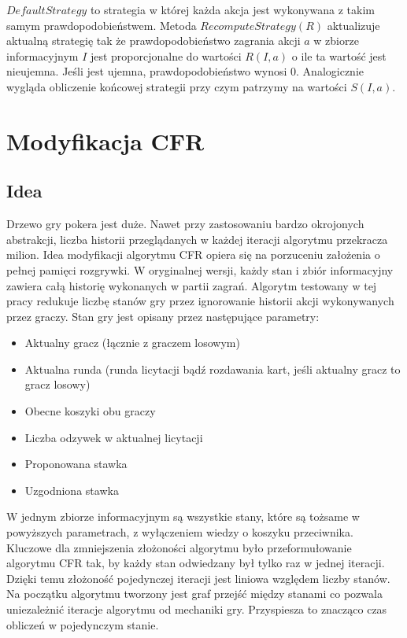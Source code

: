 \documentclass[licencjacka]{pracamgr}
\begin{document}
$\,$ \\
\noindent
$DefaultStrategy$ to strategia w której każda akcja jest wykonywana z takim samym prawdopodobieństwem. Metoda
$RecomputeStrategy(R)$ aktualizuje aktualną strategię tak że prawdopodobieństwo zagrania akcji $a$ w zbiorze informacyjnym
$I$ jest proporcjonalne do wartości $R(I, a)$ o ile ta wartość jest nieujemna. Jeśli jest ujemna, prawdopodobieństwo
wynosi $0$. Analogicznie wygląda obliczenie końcowej strategii przy czym patrzymy na wartości $S(I, a)$.

\chapter{Modyfikacja CFR}

\section{Idea}

Drzewo gry pokera jest duże. Nawet przy zastosowaniu bardzo okrojonych abstrakcji, liczba historii przeglądanych w każdej
iteracji algorytmu przekracza milion. Idea modyfikacji algorytmu CFR opiera się na porzuceniu założenia o pełnej pamięci rozgrywki.
W oryginalnej wersji, każdy stan i zbiór informacyjny zawiera całą historię wykonanych w partii zagrań. Algorytm testowany
w tej pracy redukuje liczbę stanów gry przez ignorowanie historii akcji wykonywanych
przez graczy. Stan gry jest opisany przez następujące parametry: \\

\begin{itemize}
\item Aktualny gracz (łącznie z graczem losowym)
\item Aktualna runda (runda licytacji bądź rozdawania kart, jeśli aktualny gracz to gracz losowy)
\item Obecne koszyki obu graczy
\item Liczba odzywek w aktualnej licytacji
\item Proponowana stawka
\item Uzgodniona stawka
\end{itemize}

\noindent
W jednym zbiorze informacyjnym są wszystkie stany, które są tożsame w powyższych parametrach, z wyłączeniem
wiedzy o koszyku przeciwnika. \\

\noindent
Kluczowe dla zmniejszenia złożoności algorytmu było przeformułowanie algorytmu CFR tak, by każdy
stan odwiedzany był tylko raz w jednej iteracji. Dzięki temu złożoność pojedynczej iteracji jest
liniowa względem liczby stanów. Na początku algorytmu tworzony jest graf przejść między
stanami co pozwala uniezależnić iteracje algorytmu od mechaniki gry. Przyspiesza to znacząco
czas obliczeń w pojedynczym stanie.
\end{document}
